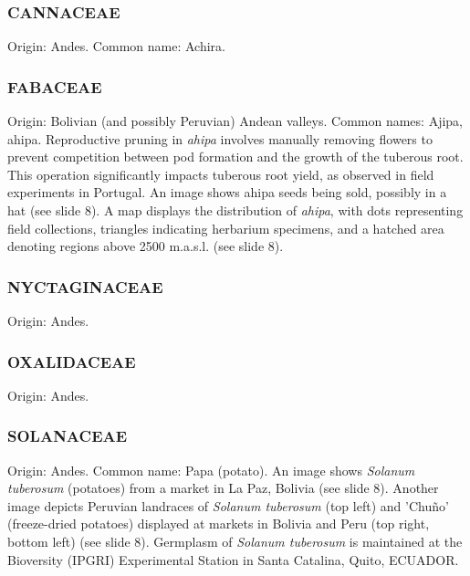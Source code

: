 \subsubsection*{CANNACEAE} 
Origin: Andes. Common name: Achira.

\subsubsection*{FABACEAE} 
Origin: Bolivian (and possibly Peruvian) Andean valleys. Common names: Ajipa, ahipa. Reproductive pruning in \textit{ahipa} involves manually removing flowers to prevent competition between pod formation and the growth of the tuberous root. This operation significantly impacts tuberous root yield, as observed in field experiments in Portugal. An image shows ahipa seeds being sold, possibly in a hat (see slide 8). A map displays the distribution of \textit{ahipa}, with dots representing field collections, triangles indicating herbarium specimens, and a hatched area denoting regions above 2500 m.a.s.l. (see slide 8).

\subsubsection*{NYCTAGINACEAE} 
Origin: Andes.

\subsubsection*{OXALIDACEAE} 
Origin: Andes.

\subsubsection*{SOLANACEAE} 
Origin: Andes. Common name: Papa (potato). An image shows \textit{Solanum tuberosum} (potatoes) from a market in La Paz, Bolivia (see slide 8). Another image depicts Peruvian landraces of \textit{Solanum tuberosum} (top left) and 'Chuño' (freeze-dried potatoes) displayed at markets in Bolivia and Peru (top right, bottom left) (see slide 8). Germplasm of \textit{Solanum tuberosum} is maintained at the Bioversity (IPGRI) Experimental Station in Santa Catalina, Quito, ECUADOR.

